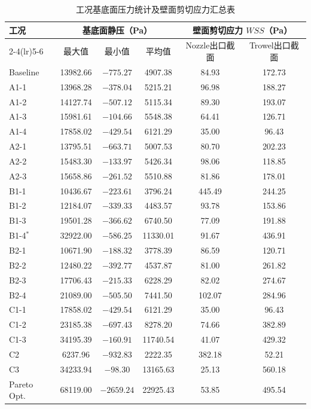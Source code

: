 \begin{table}[!htb]
  \caption{工况基底面压力统计及壁面剪切应力汇总表}\label{tab:appendix-wss}
  \centering
  \begin{tabular}{@{}lccccc@{}}
    \toprule
    \multirow{2}{*}{工况} &
    \multicolumn{3}{c}{基底面静压（Pa）} &
    \multicolumn{2}{c}{壁面剪切应力 $WSS$（Pa）} \\
    \cmidrule(lr){2-4}\cmidrule(lr){5-6}
     & 最大值 & 最小值 & 平均值 & Nozzle出口截面 & Trowel出口截面 \\
    \midrule
    Baseline     & 13982.66 &  $ -775.27$ &  4907.38 &  84.93 & 172.73 \\
    A1-1         & 13968.28 &  $ -378.04$ &  5215.21 &  96.98 & 188.27 \\
    A1-2         & 14127.74 &  $ -507.12$ &  5115.34 &  89.30 & 193.07 \\
    A1-3         & 15981.61 &  $ -104.66$ &  5548.38 &  64.41 & 126.71 \\
    A1-4         & 17858.02 &  $ -429.54$ &  6121.29 &  35.00 &  96.43 \\
    A2-1         & 13795.51 &  $ -663.71$ &  5007.53 &  80.70 & 202.23 \\
    A2-2         & 15483.30 &  $ -133.97$ &  5426.34 &  98.06 & 118.85 \\
    A2-3         & 15658.86 &  $ -261.52$ &  5510.88 &  81.86 & 178.01 \\
    B1-1         & 10436.67 &  $ -223.61$ &  3796.24 & 445.49 & 244.25 \\
    B1-2         & 12184.07 &  $ -339.33$ &  4483.57 &  93.78 & 153.86 \\
    B1-3         & 19501.28 &  $ -366.62$ &  6740.50 &  77.09 & 191.88 \\
    B1-4$^*$     & 32922.00 &  $ -586.25$ & 11330.01 &  91.67 & 436.91 \\
    B2-1         & 10671.90 &  $ -188.32$ &  3778.39 &  86.59 & 120.71 \\
    B2-2         & 12480.22 &  $ -392.77$ &  4537.87 &  81.00 & 261.82 \\
    B2-3         & 17706.43 &  $ -215.33$ &  6228.29 &  82.02 & 274.67 \\
    B2-4         & 21089.00 &  $ -505.50$ &  7441.50 & 102.07 & 284.96 \\
    C1-1         & 17858.02 &  $ -429.54$ &  6121.29 &  35.00 &  96.43 \\
    C1-2         & 23185.38 &  $ -697.43$ &  8278.20 &  74.66 & 382.89 \\
    C1-3         & 34195.39 &  $ -160.91$ & 11740.54 &  41.07 & 429.32 \\
    C2           &  6237.96 &  $ -932.83$ &  2222.35 & 382.18 &  52.21 \\
    C3           & 34233.94 &  $ -98.30 $ & 13165.63 &  25.13 & 560.18 \\
    Pareto Opt.  & 68119.00 &  $-2659.24$ & 22925.43 &  53.85 & 495.54 \\
    \bottomrule
  \end{tabular}
\end{table}


